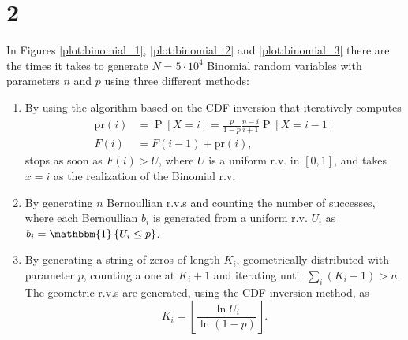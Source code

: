 \documentclass[a4paper,oneside]{article}
\newcommand{\floor}[1]{\left\lfloor#1\right\rfloor}
\newcommand{\Prob}[1]{\operatorname{P}\left[#1\right]}
\newcommand{\ind}[1]{\operatorname{\mathbbm{1}}\left\{#1\right\}}
\begin{document}
\section*{2}
In Figures \ref{plot:binomial_1}, \ref{plot:binomial_2} and
\ref{plot:binomial_3} there are the times it takes to generate
$N=5\cdot10^4$ Binomial random variables with parameters $n$ and $p$
using three different methods:
\begin{enumerate}
\item By using the algorithm based on the CDF inversion that
  iteratively computes
  \begin{align*}
    \mathrm{pr}(i) &= \Prob{X = i} = \frac{p}{1-p}\frac{n-i}{i+1}\Prob{X = i-1} \\
    F(i) &= F(i-1) + \mathrm{pr}(i) ,
  \end{align*}
  stops as soon as $F(i) > U$, where $U$ is a uniform r.v. in $[0,
    1]$, and takes $x = i$ as the realization of the Binomial r.v.
  \item By generating $n$ Bernoullian r.v.s and counting the number of
    successes, where each Bernoullian $b_i$ is generated from a uniform
    r.v. $U_i$ as $b_i = \ind{U_i \leq p}$.
  \item By generating a string of zeros of length $K_i$, geometrically
    distributed with parameter $p$, counting a one at $K_i+1$ and
    iterating until $\sum_i \left( K_i + 1 \right) > n$. The geometric
    r.v.s are generated, using the CDF inversion method, as
    \[ K_i = \floor{\frac{\ln U_i}{\ln (1 - p)}} . \]
\end{enumerate}
\end{document}
